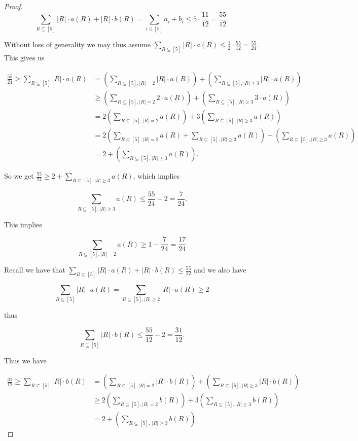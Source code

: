\documentclass{article}
\begin{document}
\begin{proof}
$$\sum_{R \subseteq [5]} |R| \cdot a(R) + |R| \cdot b(R) = \sum_{i \in [5]} a_i + b_i \leq 5 \cdot \frac{11}{12} = \frac{55}{12}.$$


\noindent
Without loss of generality we may thus assume $\sum_{R \subseteq [5]} |R| \cdot a(R)  \leq \frac{1}{2} \cdot \frac{55}{12} = \frac{55}{24}$. This gives us

\begin{align*}
\frac{55}{24} \geq \sum_{R \subseteq [5]} |R| \cdot a(R) &=  \left( \sum_{R \subseteq [5], |R| = 2} |R| \cdot a(R) \right) + \left( \sum_{R \subseteq [5], |R| \geq 3} |R| \cdot a(R) \right) \\
&\geq  \left( \sum_{R \subseteq [5], |R| = 2} 2 \cdot a(R) \right) + \left( \sum_{R \subseteq [5], |R| \geq 3} 3 \cdot a(R) 
\right) \\
&=  2 \left( \sum_{R \subseteq [5], |R| = 2} a(R) \right) + 3 \left( \sum_{R \subseteq [5], |R| \geq 3} a(R) 
\right) \\
&= 2 \left( \sum_{R \subseteq [5], |R| = 2} a(R) +  \sum_{R \subseteq [5], |R| \geq 3} a(R) \right) + \left( \sum_{R \subseteq [5], |R| \geq 3} a(R) 
\right) \\
&= 2 + \left( \sum_{R \subseteq [5], |R| \geq 3} a(R) \right). 
\end{align*}

\noindent
So we get $\frac{55}{24} \geq 2 + \sum_{R \subseteq [5], |R| \geq 3} a(R)$, which implies 

$$\sum_{R \subseteq [5], |R| \geq 3} a(R) \leq \frac{55}{24} - 2 = \frac{7}{24}.$$

\noindent 
This implies

\begin{equation}
\sum_{R \subseteq [5], |R| = 2} a(R) \geq 1- \frac{7}{24} = \frac{17}{24}
\end{equation}

Recall we have that $\sum_{R \subseteq [5]} |R| \cdot a(R) + |R| \cdot b(R) \leq \frac{55}{12}$ and we also have 

$$\sum_{R \subseteq [5]} |R| \cdot a(R) = \sum_{R \subseteq [5], |R| \geq 2} |R| \cdot a(R) \geq 2$$ 

\noindent
thus 

$$\sum_{R \subseteq [5]} |R| \cdot b(R) \leq \frac{55}{12} - 2 = \frac{31}{12}.$$

\noindent
Thus we have 

\begin{align*}
 \frac{31}{12} \geq \sum_{R \subseteq [5]} |R| \cdot b(R) &= \left( \sum_{R \subseteq [5], |R| = 2} |R| \cdot b(R) \right) + \left( \sum_{R \subseteq [5], |R| \geq 3} |R| \cdot b(R) \right) \\
&\geq 2 \left( \sum_{R \subseteq [5], |R| = 2} b(R) \right) + 3 \left( \sum_{R \subseteq [5], |R| \geq 3} b(R) \right) \\
&= 2 + \left( \sum_{R \subseteq [5], \ |R| \geq 3} b(R) \right)
\end{align*}


\end{proof}
\end{document}
